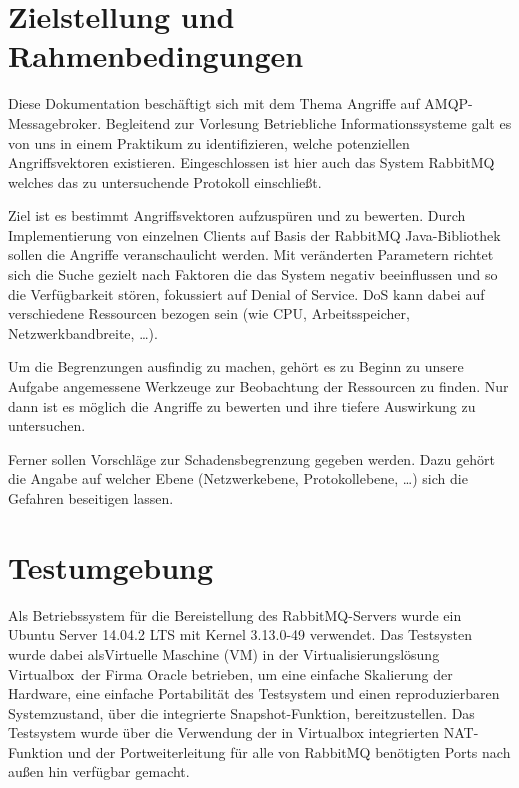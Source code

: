 \documentclass[	a4paper,
			11pt,
			titlepage,
			oneside,
			fleqn,
			listof=totoc,
			parskip,
			chapterprefix=false,
			numbers=noenddot]{scrreprt}
\begin{document}
	
	
\section*{Zielstellung und Rahmenbedingungen}
	
	Diese Dokumentation beschäftigt sich mit dem Thema \glqq Angriffe auf AMQP-Messagebroker\grqq . Begleitend zur Vorlesung  \glqq Betriebliche Informationssysteme\grqq\/ galt es von uns in einem Praktikum zu identifizieren, welche potenziellen Angriffsvektoren existieren. Eingeschlossen ist hier auch das System \glqq RabbitMQ\grqq\/ welches das zu untersuchende Protokoll einschließt.

	Ziel ist es bestimmt Angriffsvektoren aufzuspüren und zu bewerten. Durch Implementierung von einzelnen Clients auf Basis der RabbitMQ Java-Bibliothek sollen die Angriffe veranschaulicht werden.  Mit veränderten Parametern richtet sich die Suche gezielt nach Faktoren die das System negativ beeinflussen und so die Verfügbarkeit stören, fokussiert auf \glqq Denial of Service\grqq. DoS kann dabei auf verschiedene Ressourcen bezogen sein (wie CPU, Arbeitsspeicher, Netzwerkbandbreite, …).

	Um die Begrenzungen ausfindig zu machen, gehört es zu Beginn zu unsere Aufgabe angemessene Werkzeuge zur Beobachtung der Ressourcen zu finden. Nur dann ist es möglich die Angriffe zu bewerten und ihre tiefere Auswirkung zu untersuchen.

	Ferner sollen Vorschläge zur Schadensbegrenzung gegeben werden. Dazu gehört die Angabe auf welcher Ebene (Netzwerkebene, Protokollebene, …) sich die Gefahren beseitigen lassen.

\clearpage
\section*{Testumgebung}
	Als Betriebssystem für die Bereistellung des RabbitMQ-Servers wurde ein Ubuntu Server 14.04.2 LTS mit Kernel 3.13.0-49 verwendet. Das Testsysten wurde dabei alsVirtuelle Maschine (VM) in der Virtualisierungslösung \glqq Virtualbox\grqq\ der Firma Oracle betrieben, um eine einfache Skalierung der Hardware, eine einfache Portabilität des Testsystem und einen reproduzierbaren Systemzustand, über die integrierte Snapshot-Funktion, bereitzustellen. Das Testsystem wurde über die Verwendung der in Virtualbox integrierten NAT-Funktion und der Portweiterleitung für alle von RabbitMQ benötigten Ports nach außen hin verfügbar gemacht. 
	
\end{document}

